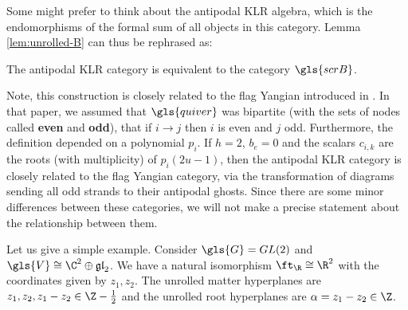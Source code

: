 Some might prefer to think about the antipodal KLR algebra, which is
the endomorphisms of the formal sum of all objects in this category.
Lemma \ref{lem:unrolled-B} can thus be rephrased as:
\begin{proposition}\label{prop:KLR-B}
The antipodal KLR category is equivalent to the category $\gls{scrB}$. 
\end{proposition}
Note, this construction is closely related to the flag Yangian introduced in \cite[Def. 4.12]{KTWWY2}.  In that paper, we assumed that $\gls{quiver} $ was bipartite (with the sets of nodes called {\bf even} and {\bf odd}), 
that if $i\to j$ then $i$ is even and $j$ odd.  Furthermore, the
definition depended on a polynomial $p_i$.  If 
$h=2$, $b_e=0$ and the scalars $c_{i,k}$ are the roots (with
multiplicity) of $p_i(2u-1)$, then the antipodal KLR category is
closely related to the flag Yangian category,
via the transformation  of diagrams sending all odd strands to their
antipodal ghosts.  Since there are some minor differences between
these categories, we will not make a precise statement about the
relationship between them.  


Let us give a simple example. Consider  $\gls{G}=GL(2)$ and $\gls{V}\cong \C^2\oplus \mathfrak{gl}_2$.  We have a natural isomorphism $\ft_{\R}\cong \R^2$ with the coordinates given by $z_{1},z_{2}$.  The unrolled matter hyperplanes are $z_1,z_2,z_1-z_2\in \Z-\frac{1}{2}$ and the unrolled root hyperplanes are $\alpha= z_1-z_2\in \Z$.  

